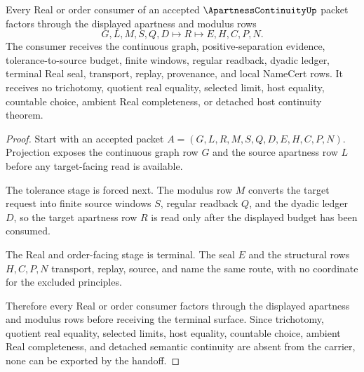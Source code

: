 \begin{theorem}
\label{thm:apartness-continuity-real-handoff}
Every Real or order consumer of an accepted $\ApartnessContinuityUp$ packet factors through the displayed apartness and modulus rows
$$
G,L,M,S,Q,D \longmapsto R \longmapsto E,H,C,P,N .
$$
The consumer receives the continuous graph, positive-separation evidence, tolerance-to-source budget, finite windows, regular readback, dyadic ledger, terminal Real seal, transport, replay, provenance, and local NameCert rows. It receives no trichotomy, quotient real equality, selected limit, host equality, countable choice, ambient Real completeness, or detached host continuity theorem.
\end{theorem}
\begin{proof}
Start with an accepted packet $A=(G,L,R,M,S,Q,D,E,H,C,P,N)$. Projection exposes the continuous graph row $G$ and the source apartness row $L$ before any target-facing read is available.

The tolerance stage is forced next. The modulus row $M$ converts the target request into finite source windows $S$, regular readback $Q$, and the dyadic ledger $D$, so the target apartness row $R$ is read only after the displayed budget has been consumed.

The Real and order-facing stage is terminal. The seal $E$ and the structural rows $H,C,P,N$ transport, replay, source, and name the same route, with no coordinate for the excluded principles.

Therefore every Real or order consumer factors through the displayed apartness and modulus rows before receiving the terminal surface. Since trichotomy, quotient real equality, selected limits, host equality, countable choice, ambient Real completeness, and detached semantic continuity are absent from the carrier, none can be exported by the handoff.
\end{proof}


